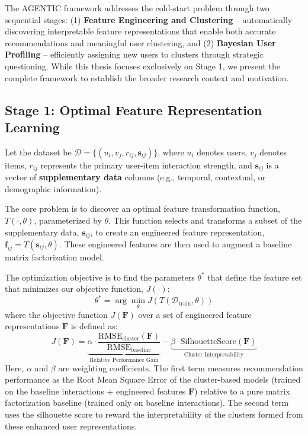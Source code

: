 The AGENTIC framework addresses the cold-start problem through two sequential stages: (1) \textbf{Feature Engineering and Clustering} -- automatically discovering interpretable feature representations that enable both accurate recommendations and meaningful user clustering, and (2) \textbf{Bayesian User Profiling} -- efficiently assigning new users to clusters through strategic questioning. While this thesis focuses exclusively on Stage 1, we present the complete framework to establish the broader research context and motivation.

\subsection*{Stage 1: Optimal Feature Representation Learning}


Let the dataset be $\mathcal{D} = \{(u_i, v_j, r_{ij}, \mathbf{s}_{ij})\}$, where $u_i$ denotes users, $v_j$ denotes items, $r_{ij}$ represents the primary user-item interaction strength, and $\mathbf{s}_{ij}$ is a vector of \textbf{supplementary data} columns (e.g., temporal, contextual, or demographic information).

The core problem is to discover an optimal feature transformation function, $T(\cdot, \theta)$, parameterized by $\theta$. This function selects and transforms a subset of the supplementary data, $\mathbf{s}_{ij}$, to create an engineered feature representation, $\mathbf{f}_{ij} = T(\mathbf{s}_{ij}, \theta)$. These engineered features are then used to augment a baseline matrix factorization model.

The optimization objective is to find the parameters $\theta^*$ that define the feature set that minimizes our objective function, $J(\cdot)$:
\[
    \theta^* = \arg\min_{\theta} J(T(\mathcal{D}_{\text{train}}, \theta))
\]
where the objective function $J(\mathbf{F})$ over a set of engineered feature representations $\mathbf{F}$ is defined as:
\[
    J(\mathbf{F}) = 
    \underbrace{\alpha \cdot \frac{\text{RMSE}_{\text{cluster}}(\mathbf{F})}{\text{RMSE}_{\text{baseline}}}}_{\text{Relative Performance Gain}} - 
    \underbrace{\beta \cdot \text{SilhouetteScore}(\mathbf{F})}_{\text{Cluster Interpretability}}
\]
Here, $\alpha$ and $\beta$ are weighting coefficients. The first term measures recommendation performance as the Root Mean Square Error of the cluster-based models (trained on the baseline interactions + engineered features $\mathbf{F}$) relative to a pure matrix factorization baseline (trained only on baseline interactions). The second term uses the silhouette score to reward the interpretability of the clusters formed from these enhanced user representations.

